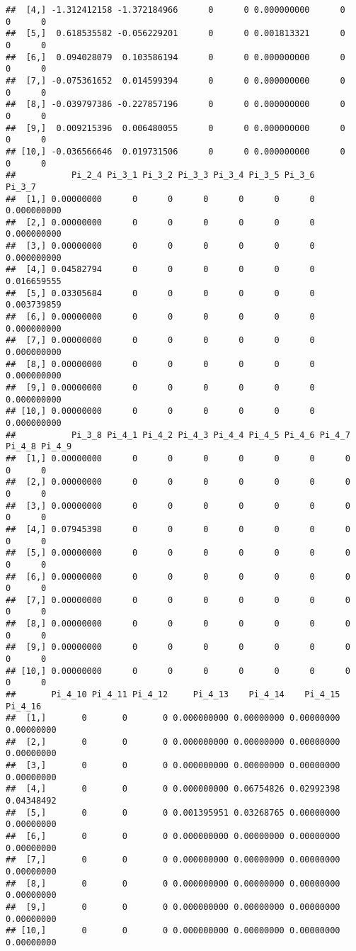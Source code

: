 \documentclass[
]{article}
\begin{document}
\begin{verbatim}
##  [4,] -1.312412158 -1.372184966      0      0 0.000000000      0      0      0
##  [5,]  0.618535582 -0.056229201      0      0 0.001813321      0      0      0
##  [6,]  0.094028079  0.103586194      0      0 0.000000000      0      0      0
##  [7,] -0.075361652  0.014599394      0      0 0.000000000      0      0      0
##  [8,] -0.039797386 -0.227857196      0      0 0.000000000      0      0      0
##  [9,]  0.009215396  0.006480055      0      0 0.000000000      0      0      0
## [10,] -0.036566646  0.019731506      0      0 0.000000000      0      0      0
##           Pi_2_4 Pi_3_1 Pi_3_2 Pi_3_3 Pi_3_4 Pi_3_5 Pi_3_6      Pi_3_7
##  [1,] 0.00000000      0      0      0      0      0      0 0.000000000
##  [2,] 0.00000000      0      0      0      0      0      0 0.000000000
##  [3,] 0.00000000      0      0      0      0      0      0 0.000000000
##  [4,] 0.04582794      0      0      0      0      0      0 0.016659555
##  [5,] 0.03305684      0      0      0      0      0      0 0.003739859
##  [6,] 0.00000000      0      0      0      0      0      0 0.000000000
##  [7,] 0.00000000      0      0      0      0      0      0 0.000000000
##  [8,] 0.00000000      0      0      0      0      0      0 0.000000000
##  [9,] 0.00000000      0      0      0      0      0      0 0.000000000
## [10,] 0.00000000      0      0      0      0      0      0 0.000000000
##           Pi_3_8 Pi_4_1 Pi_4_2 Pi_4_3 Pi_4_4 Pi_4_5 Pi_4_6 Pi_4_7 Pi_4_8 Pi_4_9
##  [1,] 0.00000000      0      0      0      0      0      0      0      0      0
##  [2,] 0.00000000      0      0      0      0      0      0      0      0      0
##  [3,] 0.00000000      0      0      0      0      0      0      0      0      0
##  [4,] 0.07945398      0      0      0      0      0      0      0      0      0
##  [5,] 0.00000000      0      0      0      0      0      0      0      0      0
##  [6,] 0.00000000      0      0      0      0      0      0      0      0      0
##  [7,] 0.00000000      0      0      0      0      0      0      0      0      0
##  [8,] 0.00000000      0      0      0      0      0      0      0      0      0
##  [9,] 0.00000000      0      0      0      0      0      0      0      0      0
## [10,] 0.00000000      0      0      0      0      0      0      0      0      0
##       Pi_4_10 Pi_4_11 Pi_4_12     Pi_4_13    Pi_4_14    Pi_4_15    Pi_4_16
##  [1,]       0       0       0 0.000000000 0.00000000 0.00000000 0.00000000
##  [2,]       0       0       0 0.000000000 0.00000000 0.00000000 0.00000000
##  [3,]       0       0       0 0.000000000 0.00000000 0.00000000 0.00000000
##  [4,]       0       0       0 0.000000000 0.06754826 0.02992398 0.04348492
##  [5,]       0       0       0 0.001395951 0.03268765 0.00000000 0.00000000
##  [6,]       0       0       0 0.000000000 0.00000000 0.00000000 0.00000000
##  [7,]       0       0       0 0.000000000 0.00000000 0.00000000 0.00000000
##  [8,]       0       0       0 0.000000000 0.00000000 0.00000000 0.00000000
##  [9,]       0       0       0 0.000000000 0.00000000 0.00000000 0.00000000
## [10,]       0       0       0 0.000000000 0.00000000 0.00000000 0.00000000
\end{verbatim}
\end{document}
